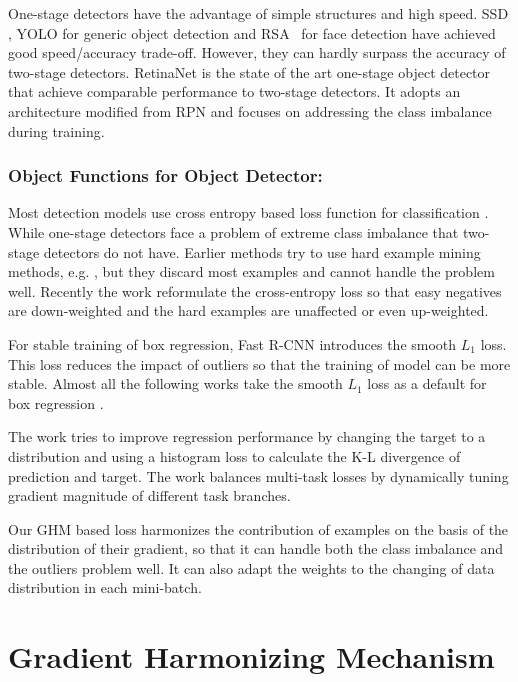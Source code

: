 \documentclass[letterpaper]{article} \usepackage{aaai19}  \usepackage{times}  \usepackage{helvet}  \usepackage{courier}  \usepackage{url}  \usepackage{graphicx}  \usepackage{amsmath,amssymb}
\begin{document}
 One-stage detectors have the advantage of simple structures and high speed. SSD \cite{ssd,dssd}, YOLO \cite{yolo,yolov2,yolov3} for generic object detection and RSA~\cite{songbeyond,liu2017recurrent} for face detection have achieved good speed/accuracy trade-off. However, they can hardly surpass the accuracy of two-stage detectors. RetinaNet \cite{focal} is the state of the art one-stage object detector that achieve comparable performance to two-stage detectors. It adopts an architecture modified from RPN \cite{faster} and focuses on addressing the class imbalance during training.

\subsubsection{Object Functions for Object Detector:}
Most detection models use cross entropy based loss function for classification \cite{fast,faster,ssd,rfcn,fpn,mask}. While one-stage detectors face a problem of extreme class imbalance that two-stage detectors do not have. Earlier methods try to use hard example mining methods, e.g. \cite{ohem,casdpm}, but they discard most examples and cannot handle the problem well. Recently the work \cite{focal} reformulate the cross-entropy loss so that easy negatives are down-weighted and the hard examples are unaffected or even up-weighted. 

For stable training of box regression, Fast R-CNN \cite{fast} introduces the smooth $L_1$ loss. This loss reduces the impact of outliers so that the training of model can be more stable. Almost all the following works take the smooth $L_1$ loss as a default for box regression \cite{faster,ssd,rfcn,fpn,mask}. 

The work \cite{dist} tries to improve regression performance by changing the target to a distribution and using a histogram loss to calculate the K-L divergence of prediction and target. The work \cite{grad} balances multi-task losses by dynamically tuning gradient magnitude of different task branches.

Our GHM based loss harmonizes the contribution of examples on the basis of the distribution of their gradient, so that it can handle both the class imbalance and the outliers problem well. It can also adapt the weights to the changing of data distribution in each mini-batch.


\section{Gradient Harmonizing Mechanism}
\label{sec:ghm}
\end{document}
